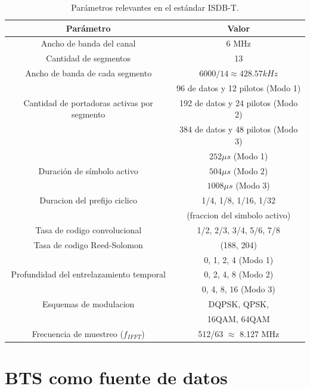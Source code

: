 \begin{table}[h!]
\centering
\begin{tabular}{|c|c|}
\hline
\textbf{Parámetro} 				& \textbf{Valor}\\
\hline
Ancho de banda del canal 		& 6 MHz\\
\hline
Cantidad de segmentos 			& 13 \\
\hline
Ancho de banda de cada segmento & $6000/14 \approx 428.57kHz$ \\
\hline
  											& 96 de datos y 12 pilotos (Modo 1) \\
Cantidad de portadoras activas por segmento & 192 de datos y 24 pilotos (Modo 2) \\
 											& 384 de datos y 48 pilotos (Modo 3)\\
\hline
 								& $252 \mu s$ (Modo 1)\\
Duración de símbolo activo 		& $504 \mu s$ (Modo 2) \\
								& $1008 \mu s$ (Modo 3) \\
\hline
Duracion del prefijo ciclico 	& 1/4, 1/8, 1/16, 1/32 \\
 								& (fraccion del simbolo activo)\\
\hline
Tasa de codigo convolucional 	& 1/2, 2/3, 3/4, 5/6, 7/8\\
\hline
Tasa de codigo Reed-Solomon 	& (188, 204) \\
\hline
 								& 0, 1, 2, 4 (Modo 1) \\
Profundidad del entrelazamiento temporal & 0, 2, 4, 8 (Modo 2) \\
 & 0, 4, 8, 16 (Modo 3)\\
\hline
Esquemas de modulacion & DQPSK, QPSK,\\
 & 16QAM, 64QAM\\
 \hline
 Frecuencia de muestreo ($f_{IFFT}$) & 512/63 $\approx$ 8.127 MHz\\
 \hline
\end{tabular}
\caption{\label{parametros_ISDBT} Par\'ametros relevantes en el est\'andar ISDB-T.}
\end{table}



\section{BTS como fuente de datos}

